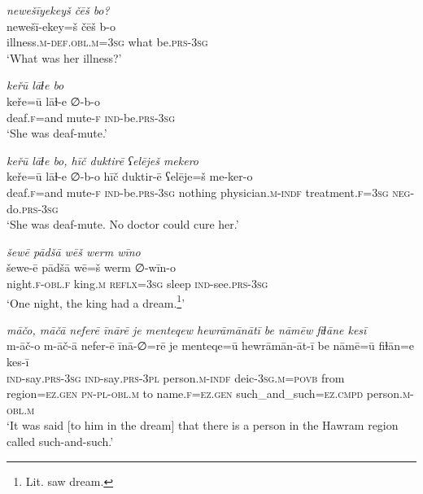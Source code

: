 \ea \label{ZP.27}
\textit{newešīyekeyš čēš bo?} \\ 
\gll newešī-ekey=š čēš b-o \\ 
 illness\textsc{.m}\textsc{-def}\textsc{.obl}\textsc{.m}\textsc{=3sg} what be\textsc{.prs}\textsc{-3sg} \\ 
\glt `What was her illness?'
\z 
 
\ea \label{ZP.28}
\textit{keřū lāɫe bo} \\ 
\gll keře=ū lāɫ-e ∅-b-o \\ 
 deaf\textsc{.f}=and mute\textsc{-f} \textsc{ind-}be\textsc{.prs}\textsc{-3sg} \\ 
\glt `She was deaf-mute.'
\z 
 
\ea \label{ZP.29}
\textit{keřū lāɫe bo, hīč duktirē ʕelēješ mekero} \\ 
\gll keře=ū lāɫ-e ∅-b-o hīč duktir-ē ʕelēje=š me-ker-o \\ 
 deaf\textsc{.f}=and mute\textsc{-f} \textsc{ind-}be\textsc{.prs}\textsc{-3sg} nothing physician\textsc{.m}\textsc{-indf} treatment\textsc{.f}\textsc{=3sg} \textsc{neg-}do\textsc{.prs}\textsc{-3sg} \\ 
\glt `She was deaf-mute. No doctor could cure her.'
\z 
 
\ea \label{ZP.30}
\textit{šewē pādšā wēš werm wīno} \\ 
\gll šewe-ē pādšā wē=š werm ∅-wīn-o \\ 
 night\textsc{.f}\textsc{-obl}\textsc{.f} king\textsc{.m} \textsc{reflx}\textsc{=3sg} sleep \textsc{ind-}see\textsc{.prs}\textsc{-3sg} \\ 
\glt `One night, the king had a dream.\footnote{Lit. saw dream.}'
\z 
 
\ea \label{ZP.31}
\textit{māčo, māčā neferē īnārē je menteqew hewrāmānātī be nāmēw fiɫāne kesī} \\ 
\gll m-āč-o m-āč-ā nefer-ē īnā-∅=rē je menteqe=ū hewrāmān-āt-ī be nāmē=ū fiɫān=e kes-ī \\ 
 \textsc{ind-}say\textsc{.prs}\textsc{-3sg} \textsc{ind-}say\textsc{.prs}\textsc{-3pl} person\textsc{.m}\textsc{-indf} deic\textsc{-3sg}\textsc{.m}\textsc{=\textsc{povb}} from region\textsc{\textsc{=ez.gen}} \textsc{pn}\textsc{\textsc{-pl}}\textsc{-obl}\textsc{.m} to name\textsc{.f}\textsc{\textsc{=ez.gen}} such\_and\_such\textsc{=ez}\textsc{.cmpd} person\textsc{.m}\textsc{-obl}\textsc{.m} \\ 
\glt `It was said [to him in the dream] that there is a person in the Hawram region called such-and-such.'
\z 
 
